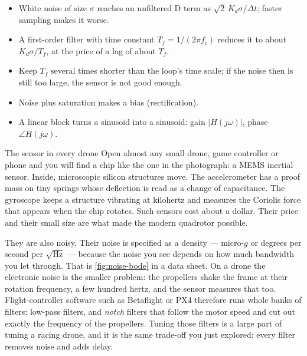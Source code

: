 \begin{remember}
\begin{itemize}
  \item White noise of size $\sigma$ reaches an unfiltered D term as $\sqrt2\,K_d\sigma/\Delta t$; faster sampling makes it worse.
  \item A first-order filter with time constant $T_f = 1/(2\pi f_c)$ reduces it to about $K_d\sigma/T_f$, at the price of a lag of about $T_f$.
  \item Keep $T_f$ several times shorter than the loop's time scale; if the noise then is still too large, the sensor is not good enough.
  \item Noise plus saturation makes a bias (rectification).
  \item A linear block turns a sinusoid into a sinusoid: gain $|H(j\omega)|$, phase $\angle H(j\omega)$.
\end{itemize}
\end{remember}

\begin{curiosity}{The sensor in every drone}
Open almost any small drone, game controller or phone and you will find a chip like the one in the photograph: a MEMS inertial sensor. Inside, microscopic silicon structures move. The accelerometer has a proof mass on tiny springs whose deflection is read as a change of capacitance. The gyroscope keeps a structure vibrating at kilohertz and measures the Coriolis force that appears when the chip rotates. Such sensors cost about a dollar. Their price and their small size are what made the modern quadrotor possible.

They are also noisy. Their noise is specified as a density — micro-$g$ or degrees per second per $\sqrt{\text{Hz}}$ — because the noise you see depends on how much bandwidth you let through. That is \cref{fig:noise-bode} in a data sheet. On a drone the electronic noise is the smaller problem: the propellers shake the frame at their rotation frequency, a few hundred hertz, and the sensor measures that too. Flight-controller software such as Betaflight or PX4 therefore runs whole banks of filters: low-pass filters, and \emph{notch} filters that follow the motor speed and cut out exactly the frequency of the propellers. Tuning those filters is a large part of tuning a racing drone, and it is the same trade-off you just explored: every filter removes noise and adds delay.
\end{curiosity}

